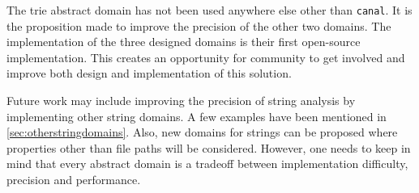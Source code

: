 \documentclass[12pt,final,oneside]{fithesis2}
\theoremstyle{definition}
\begin{document}
The trie abstract domain has not been used anywhere else other than
\texttt{canal}. It is the proposition made to improve the precision of the
other two domains. The implementation of the three designed domains is
their first open-source implementation. This creates an opportunity for
community to get involved and improve both design and implementation of this
solution.

Future work may include improving the precision of string analysis by
implementing other string domains. A few examples have been mentioned
in \ref{sec:otherstringdomains}. Also, new domains for strings can be
proposed where properties other than file paths will be considered. However,
one needs to keep in mind that every abstract domain is a tradeoff between
implementation difficulty, precision and performance.

\end{document}
